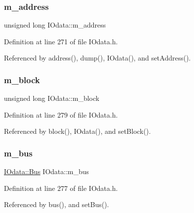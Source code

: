 \subsubsection{\texorpdfstring{m\+\_\+address}{m\_address}}
{\footnotesize\ttfamily unsigned long I\+Odata\+::m\+\_\+address\hspace{0.3cm}{\ttfamily [private]}}



Definition at line 271 of file I\+Odata.\+h.



Referenced by address(), dump(), I\+Odata(), and set\+Address().

\mbox{\label{classIOdata_a6d1ce9f88db6b97ce61098a3693e253f}} 
\subsubsection{\texorpdfstring{m\+\_\+block}{m\_block}}
{\footnotesize\ttfamily unsigned long I\+Odata\+::m\+\_\+block\hspace{0.3cm}{\ttfamily [private]}}



Definition at line 279 of file I\+Odata.\+h.



Referenced by block(), I\+Odata(), and set\+Block().

\mbox{\label{classIOdata_a42c07a9b3f43ec35dd18d13a67d294cc}} 
\subsubsection{\texorpdfstring{m\+\_\+bus}{m\_bus}}
{\footnotesize\ttfamily \hyperlink{classIOdata_a99aa7bed39364c4359ab8a7596bc013c}{I\+Odata\+::\+Bus} I\+Odata\+::m\+\_\+bus\hspace{0.3cm}{\ttfamily [private]}}



Definition at line 277 of file I\+Odata.\+h.



Referenced by bus(), and set\+Bus().

\mbox{\label{classIOdata_a8d698e077b7898009691b9086a3e6453}} 
